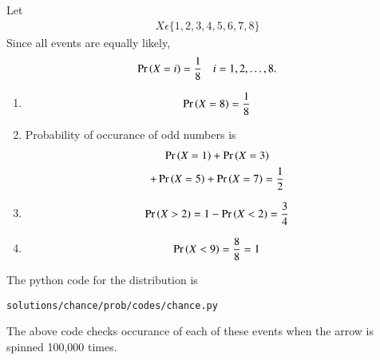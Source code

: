 Let
\begin{align}
X \epsilon \{1,2,3,4,5,6,7,8\}
\end{align}
Since all events are equally likely,
\begin{align}
\Pr\left(X=i\right)=	\frac{1}{8} \quad i = 1,2,\dots,8.
\end{align}
\begin{enumerate}
\item 
\begin{align}
\Pr\left(X=8\right) = \frac{1}{8}
\end{align}

\item Probability of occurance of odd numbers is
\begin{multline}
\Pr\left(X=1\right)+\Pr\left(X=3\right)
\\
+\Pr\left(X=5\right)+\Pr\left(X=7\right) = \frac{1}{2}
\end{multline}
\item 
\begin{align}
\Pr\left(X > 2\right)=1 -\Pr\left(X < 2\right)  = \frac{3}{4}
\end{align}
\item 
\begin{align}
\Pr\left(X < 9\right) =\frac{8}{8}=1
\end{align}
\end{enumerate}

The python code for the distribution is
\begin{lstlisting}
solutions/chance/prob/codes/chance.py
\end{lstlisting}
The above code checks occurance of each of these events when the arrow is spinned 100,000 times.
